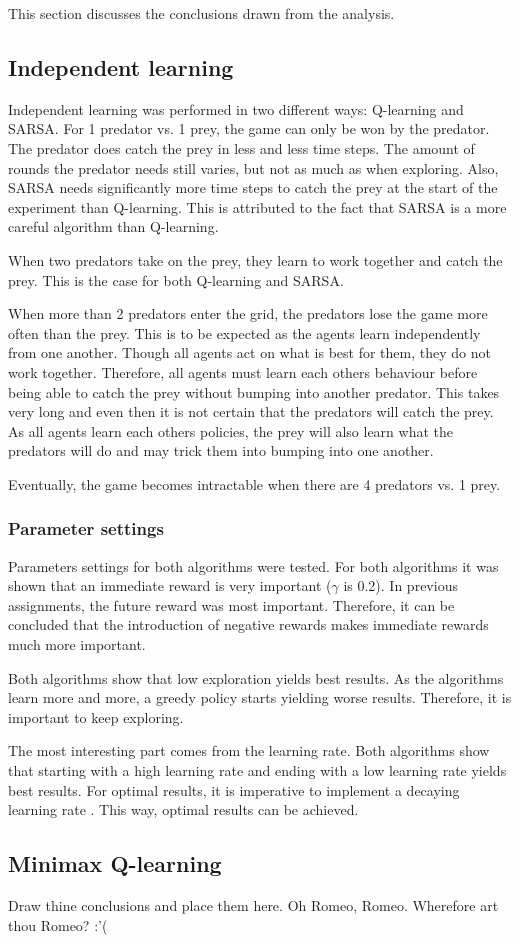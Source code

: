 This section discusses the conclusions drawn from the analysis. %

\subsection{Independent learning}
Independent learning was performed in two different ways: Q-learning and SARSA. For 1 predator vs. 1 prey, the game can only be won by the predator. The predator does catch the prey in less and less time steps. The amount of rounds the predator needs still varies, but not as much as when exploring. Also, SARSA needs significantly more time steps to catch the prey at the start of the experiment than Q-learning. This is attributed to the fact that SARSA is a more careful algorithm than Q-learning.

When two predators take on the prey, they learn to work together and catch the prey. This is the case for both Q-learning and SARSA.

When more than 2 predators enter the grid, the predators lose the game more often than the prey. This is to be expected as the agents learn independently from one another. Though all agents act on what is best for them, they do not work together. Therefore, all agents must learn each others behaviour before being able to catch the prey without bumping into another predator. This takes very long and even then it is not certain that the predators will catch the prey. As all agents learn each others policies, the prey will also learn what the predators will do and may trick them into bumping into one another. 

Eventually, the game becomes intractable when there are 4 predators vs. 1 prey.

\subsubsection{Parameter settings}
Parameters settings for both algorithms were tested. For both algorithms it was shown that an immediate reward is very important ($\gamma$ is 0.2). In previous assignments, the future reward was most important. Therefore, it can be concluded that the introduction of negative rewards makes immediate rewards much more important.

Both algorithms show that low exploration yields best results. As the algorithms learn more and more, a greedy policy starts yielding worse results. Therefore, it is important to keep exploring.

The most interesting part comes from the learning rate. Both algorithms show that starting with a high learning rate and ending with a low learning rate yields best results. For optimal results, it is imperative to implement a decaying learning rate \cite{even2004learning}. This way, optimal results can be achieved.

\subsection{Minimax Q-learning}
Draw thine conclusions and place them here. Oh Romeo, Romeo. Wherefore art thou Romeo? :'(